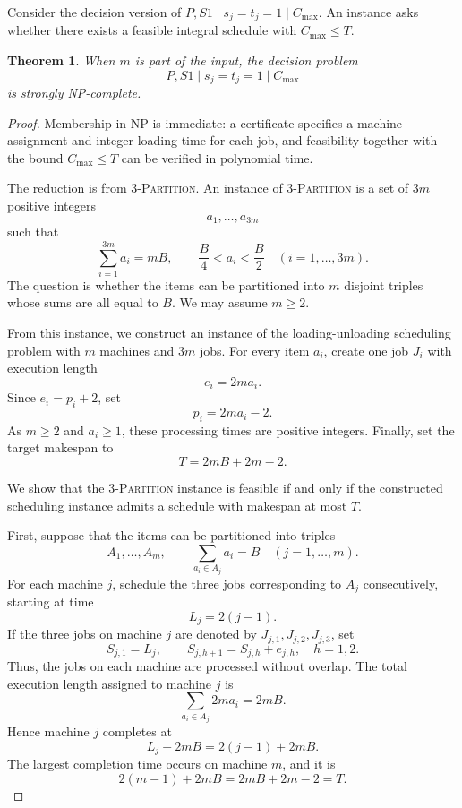 \documentclass[11pt]{article}
\newtheorem{theorem}{Theorem}[section]
\begin{document}
Consider the decision version of
$ P,S1\mid s_j=t_j=1\mid C_{\max}.$
An instance asks whether there exists a feasible integral schedule with
$C_{\max}\le T .$

\begin{theorem}
\label{thm:variable-m-strongly-np-complete}
When \(m\) is part of the input, the decision problem
\[
        P,S1\mid s_j=t_j=1\mid C_{\max}
\]
is strongly NP-complete.
\end{theorem}

\begin{proof}
Membership in NP is immediate: a certificate specifies a machine assignment and
integer loading time for each job, and feasibility together with the bound
\(C_{\max}\le T\) can be verified in polynomial time.


The reduction is from \textsc{3-Partition}. An instance of \textsc{3-Partition} is a
set of \(3m\) positive integers
\[
        a_1,\ldots,a_{3m}
\]
such that
\[
        \sum_{i=1}^{3m}a_i=mB,
        \qquad
        \frac{B}{4}<a_i<\frac{B}{2}
        \quad (i=1,\ldots,3m).
\]
The question is whether the items can be partitioned into \(m\) disjoint triples
whose sums are all equal to \(B\). We may assume \(m\ge2\).

From this instance, we construct an instance of the loading-unloading scheduling
problem with \(m\) machines and \(3m\) jobs. For every item \(a_i\), create one
job \(J_i\) with execution length
\[
        e_i=2m a_i .
\]
Since \(e_i=p_i+2\), set
\[
        p_i=2m a_i-2 .
\]
As \(m\ge2\) and \(a_i\ge1\), these processing times are positive integers.
Finally, set the target makespan to
\[
        T=2mB+2m-2 .
\]

We show that the \textsc{3-Partition} instance is feasible if and only if the
constructed scheduling instance admits a schedule with makespan at most \(T\).

First, suppose that the items can be partitioned into triples
\[
        A_1,\ldots,A_m,
        \qquad
        \sum_{a_i\in A_j}a_i=B
        \quad (j=1,\ldots,m).
\]
For each machine \(j\), schedule the three jobs corresponding to \(A_j\)
consecutively, starting at time
\[
        L_j=2(j-1).
\]
If the three jobs on machine \(j\) are denoted by
\(J_{j,1},J_{j,2},J_{j,3}\), set
\[
        S_{j,1}=L_j,
        \qquad
        S_{j,h+1}=S_{j,h}+e_{j,h},
        \quad h=1,2.
\]
Thus, the jobs on each machine are processed without overlap. The total execution
length assigned to machine \(j\) is
\[
        \sum_{a_i\in A_j}2m a_i=2mB.
\]
Hence machine \(j\) completes at
\[
        L_j+2mB=2(j-1)+2mB.
\]
The largest completion time occurs on machine \(m\), and it is
\[
        2(m-1)+2mB=2mB+2m-2=T.
\]


\end{proof}
\end{document}
